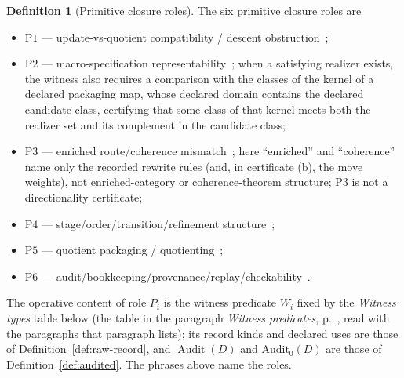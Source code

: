 \documentclass[11pt]{article}
\theoremstyle{definition}
\newtheorem{definition}[theorem]{Definition}
\newcommand{\Audit}[1]{\ensuremath{\operatorname{Audit}\!\left(#1\right)}}
\newcommand{\Pone}{\ensuremath{\mathrm{P1}}}
\newcommand{\Ptwo}{\ensuremath{\mathrm{P2}}}
\newcommand{\Pthree}{\ensuremath{\mathrm{P3}}}
\newcommand{\Pfour}{\ensuremath{\mathrm{P4}}}
\newcommand{\Pfive}{\ensuremath{\mathrm{P5}}}
\newcommand{\Psix}{\ensuremath{\mathrm{P6}}}
\begin{document}
\begin{definition}[Primitive closure roles]\label{def:primitive-roles}
The six primitive closure roles are
\begin{itemize}[topsep=2pt,itemsep=1pt]
  \item \Pone{} --- update-vs-quotient compatibility / descent
    obstruction~\citep{GrothendieckSGA1,JanelidzeTholen1994};
  \item \Ptwo{} --- macro-specification
    representability~\citep{MacLane1998}; when a satisfying realizer exists,
    the witness also requires a comparison with the classes of the kernel of
    a declared packaging map, whose declared domain contains the declared
    candidate class, certifying that some class of that kernel meets both
    the realizer set and its complement in the candidate class;
  \item \Pthree{} --- enriched route/coherence
    mismatch~\citep{BaaderNipkow1998,Nakahara2003}; here ``enriched'' and
    ``coherence'' name only the recorded rewrite rules (and, in certificate
    (b), the move weights), not enriched-category or coherence-theorem
    structure; \Pthree{} is not a directionality certificate;
  \item \Pfour{} --- stage/order/transition/refinement
    structure~\citep{Milner1989,BackVonWright1998};
  \item \Pfive{} --- quotient packaging /
    quotienting~\citep{KemenySnell1960};
  \item \Psix{} --- audit/bookkeeping/provenance/replay/checkability~\citep{GreenKarvounarakisTannen2007,Merkle1987}.
\end{itemize}
The operative content of role \(P_i\) is the witness predicate \(W_i\) fixed by
the \emph{Witness types} table below (the table in the paragraph \emph{Witness predicates},
p.~\pageref{tab:witness-types}, read with the paragraphs that paragraph lists); its record kinds and declared uses are those
of Definition~\ref{def:raw-record}, and \(\Audit{D}\) and \(\mathrm{Audit}_0(D)\)
are those of Definition~\ref{def:audited}. The phrases above name the roles.
\end{definition}
\end{document}
